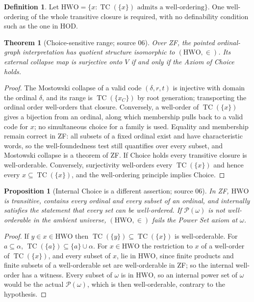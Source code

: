 \documentclass[11pt,letterpaper]{article}
\newtheorem{theorem}{Theorem}[section]
\newtheorem{proposition}[proposition]{Proposition}\aliascntresetthe{proposition}
\theoremstyle{definition}
\newtheorem{definition}[definition]{Definition}\aliascntresetthe{definition}
\theoremstyle{remark}
\newcommand{\TC}{\operatorname{TC}}
\newcommand{\Pow}{\mathcal P}
\newcommand{\HWO}{\mathrm{HWO}}
\begin{document}
\begin{definition}
Let $\HWO=\{x:\TC(\{x\})\text{ admits a well-ordering}\}$. One well-ordering of
the whole transitive closure is required, with no definability condition such as
the one in $\mathrm{HOD}$.
\end{definition}

\begin{theorem}[Choice-sensitive range; source 06]\label{hset:thm:choice}
Over ZF, the pointed ordinal-graph interpretation has quotient structure
isomorphic to $(\HWO,\in)$. Its external collapse map is surjective onto $V$ if
and only if the Axiom of Choice holds.
\end{theorem}
\begin{proof}
The Mostowski collapse of a valid code $(\delta,r,t)$ is injective with domain
the ordinal $\delta$, and its range is $\TC(\{x_C\})$ by root generation;
transporting the ordinal order well-orders that closure. Conversely, a
well-order of $\TC(\{x\})$ gives a bijection from an ordinal, along which
membership pulls back to a valid code for $x$; no simultaneous choice for a
family is used. Equality and membership remain correct in ZF: all subsets of a
fixed ordinal exist and have characteristic words, so the well-foundedness test
still quantifies over every subset, and Mostowski collapse is a theorem of ZF.
If Choice holds every transitive closure is well-orderable. Conversely,
surjectivity well-orders every $\TC(\{x\})$ and hence every $x\subseteq
\TC(\{x\})$, and the well-ordering principle implies Choice.
\end{proof}

\begin{proposition}[Internal Choice is a different assertion; source 06]
\label{hset:prop:internal-choice}
In ZF, $\HWO$ is transitive, contains every ordinal and every subset of an
ordinal, and internally satisfies the statement that every set can be
well-ordered. If $\Pow(\omega)$ is not well-orderable in the ambient universe,
$(\HWO,\in)$ fails the Power Set axiom at $\omega$.
\end{proposition}
\begin{proof}
If $y\in x\in\HWO$ then $\TC(\{y\})\subseteq\TC(\{x\})$ is well-orderable. For
$a\subseteq\alpha$, $\TC(\{a\})\subseteq\{a\}\cup\alpha$. For $x\in\HWO$ the
restriction to $x$ of a well-order of $\TC(\{x\})$, and every subset of $x$, lie
in $\HWO$, since finite products and finite subsets of a well-orderable set are
well-orderable in ZF; so the internal well-order has a witness. Every subset of
$\omega$ is in $\HWO$, so an internal power set of $\omega$ would be the actual
$\Pow(\omega)$, which is then well-orderable, contrary to the hypothesis.
\end{proof}
\end{document}
